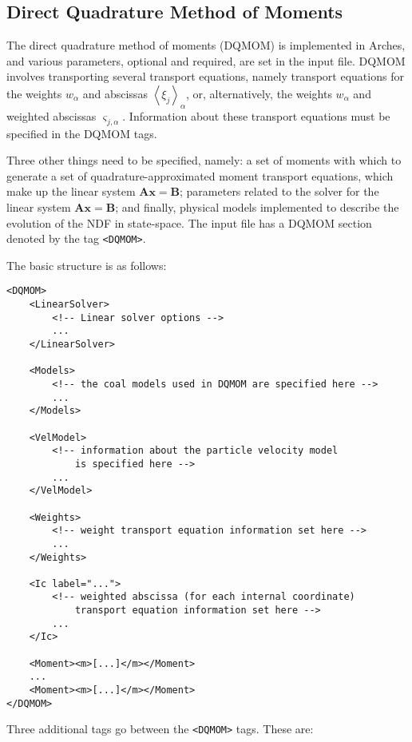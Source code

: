\subsection{Direct Quadrature Method of Moments}

The direct quadrature method of moments (DQMOM) is implemented in Arches, and various parameters, optional and required, are set in the input file. DQMOM involves transporting several transport equations, namely transport equations for the weights $w_{\alpha}$ and abscissas $ \left< \xi_{j} \right>_{\alpha}$, or, alternatively, the weights $w_{\alpha}$ and weighted abscissas $\varsigma_{j,\alpha}$.  Information about these transport equations must be specified in the DQMOM tags.

Three other things need to be specified, namely: a set of moments with which to generate a set of quadrature-approximated moment transport equations, which make up the linear system $\mathbf{Ax}=\mathbf{B}$; parameters related to the solver for the linear system $\mathbf{Ax} = \mathbf{B}$; and finally, physical models implemented to describe the evolution of the NDF in state-space. The input file has a DQMOM section denoted by the tag \verb=<DQMOM>=.

The basic structure is as follows:

\begin{Verbatim}[fontsize=\footnotesize]
<DQMOM>
	<LinearSolver>
		<!-- Linear solver options -->
		...
	</LinearSolver>
	
	<Models>
		<!-- the coal models used in DQMOM are specified here -->
		...
	</Models>
	
	<VelModel>
		<!-- information about the particle velocity model 
			is specified here -->
		...
	</VelModel>
	
	<Weights>
		<!-- weight transport equation information set here -->
		...
	</Weights>
	
	<Ic label="...">
		<!-- weighted abscissa (for each internal coordinate)
			transport equation information set here -->
		...
	</Ic>
	
	<Moment><m>[...]</m></Moment>
	...
	<Moment><m>[...]</m></Moment>
</DQMOM>
\end{Verbatim}

Three additional tags go between the \verb=<DQMOM>= tags.  These are:

